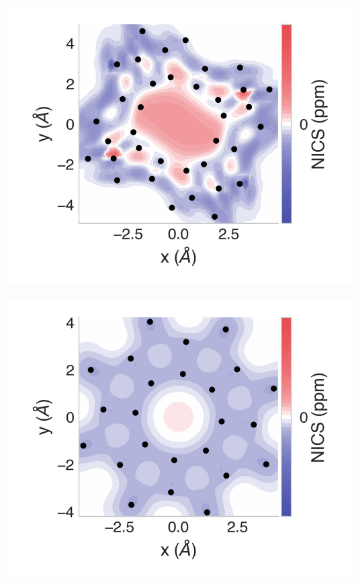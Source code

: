 \documentclass[
	fontsize=10pt, %
	twoside=true, %
	numbers=noenddot, %
]{kaobook}
\begin{document}
\begin{figure}[h]
\begin{subfigure}{5.5cm}\centering\includegraphics{p12-2d}\end{subfigure}
\begin{subfigure}{5.5cm}\centering\includegraphics{pn08-2d}\end{subfigure}%

\end{figure}
\end{document}
